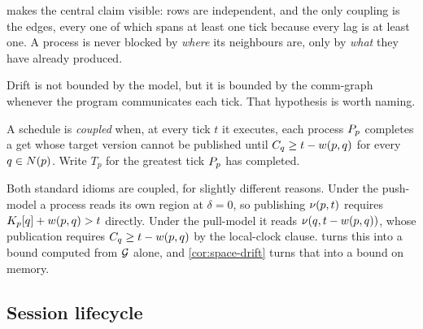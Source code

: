  makes the central claim visible: rows are independent,
and the only coupling is the edges, every one of which spans at least one tick
because every \gls{lag} is at least one. A process is never blocked by
\emph{where} its neighbours are, only by \emph{what} they have already
produced.

Drift is not bounded by the model, but it is bounded by the
\gls{comm-graph} whenever the program communicates each tick. That hypothesis
is worth naming.

\begin{definition}\label{def:coupled}
A schedule is \emph{coupled} when, at every tick $t$ it executes, each process
$P_{p}$ completes a \gls{get} whose target \gls{version} cannot be
published until $C_{q} \ge t - w(p,q)$ for every $q \in N(p)$. Write
$T_p$ for the greatest tick $P_{p}$ has completed.
\end{definition}

Both standard idioms are coupled, for slightly different reasons. Under the
\gls{push-model} a process reads its own region at $\delta = 0$, so publishing
$\nu(p,t)$ requires $K_{p}[q] + w(p,q) > t$ directly. Under the
\gls{pull-model} it reads $\nu(q,t - w(p,q))$, whose publication
requires $C_{q} \ge t - w(p,q)$ by the local-clock clause.
 turns this into a bound computed from $\mathcal{G}$ alone,
and \cref{cor:space-drift} turns that into a bound on memory.

\subsection{Session lifecycle}
\label{sec:exec-lifecycle}

